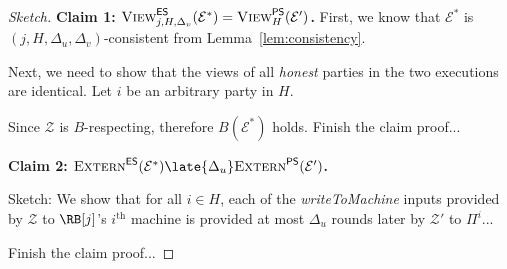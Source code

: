 \begin{proof}[Sketch]
  \noindent
  \textbf{Claim 1: $\textsc{View}^{\textsf{ES}}_{j,H,\Delta_v}(\mathcal{E}^*) = \textsc{View}^{\textsf{PS}}_H(\mathcal{E}')$.}
  First, we know that $\mathcal{E}^*$ is $(j, H, \Delta_u, \Delta_v)$-consistent
  from Lemma~\ref{lem:consistency}.

  Next, we need to show
  that the views of all \emph{honest} parties in the two executions are identical. Let
  $i$ be an arbitrary party in $H$.

  Since $\mathcal{Z}$ is $B$-respecting, therefore $B(\mathcal{E}^*)$ holds.
  {\color{red} Finish the claim proof...}

  \noindent
  \textbf{Claim 2: $\LCExtern(\mathcal{E}^*) \late{\Delta_u} \PEExtern(\mathcal{E}')$.}

  Sketch: We show that for all $i \in H$, each of the \emph{writeToMachine} inputs
  provided by $\mathcal{Z}$ to $\RB[j]$'s $i^\text{th}$ machine is provided
  at most $\Delta_u$ rounds later by $\mathcal{Z}'$ to $\Pi^i$...

  {\color{red} Finish the claim proof...}
\end{proof}

